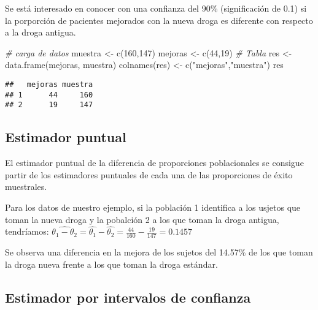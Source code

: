 \documentclass[
]{book}
\newenvironment{Shaded}{\begin{snugshade}}{\end{snugshade}}
\newcommand{\CommentTok}[1]{\textcolor[rgb]{0.56,0.35,0.01}{\textit{#1}}}
\newcommand{\DecValTok}[1]{\textcolor[rgb]{0.00,0.00,0.81}{#1}}
\newcommand{\FunctionTok}[1]{\textcolor[rgb]{0.00,0.00,0.00}{#1}}
\newcommand{\NormalTok}[1]{#1}
\newcommand{\OtherTok}[1]{\textcolor[rgb]{0.56,0.35,0.01}{#1}}
\newcommand{\StringTok}[1]{\textcolor[rgb]{0.31,0.60,0.02}{#1}}
\begin{document}
Se está interesado en conocer con una confianza del 90\% (significación de 0.1) si la porporción de pacientes mejorados con la nueva droga es diferente con respecto a la droga antigua.

\begin{Shaded}
\begin{Highlighting}[]
\CommentTok{\# carga de datos }
\NormalTok{muestra }\OtherTok{\textless{}{-}} \FunctionTok{c}\NormalTok{(}\DecValTok{160}\NormalTok{,}\DecValTok{147}\NormalTok{) }
\NormalTok{mejoras }\OtherTok{\textless{}{-}} \FunctionTok{c}\NormalTok{(}\DecValTok{44}\NormalTok{,}\DecValTok{19}\NormalTok{) }
\CommentTok{\# Tabla }
\NormalTok{res }\OtherTok{\textless{}{-}} \FunctionTok{data.frame}\NormalTok{(mejoras, muestra)}
\FunctionTok{colnames}\NormalTok{(res) }\OtherTok{\textless{}{-}} \FunctionTok{c}\NormalTok{(}\StringTok{"mejoras"}\NormalTok{,}\StringTok{"muestra"}\NormalTok{)}
\NormalTok{res}
\end{Highlighting}
\end{Shaded}

\begin{verbatim}
##   mejoras muestra
## 1      44     160
## 2      19     147
\end{verbatim}

\hypertarget{estimador-puntual}{%
\subsection{Estimador puntual}\label{estimador-puntual}}

El estimador puntual de la diferencia de proporciones poblacionales se consigue partir de los estimadores puntuales de cada una de las proporciones de éxito muestrales.

Para los datos de nuestro ejemplo, si la población 1 identifica a los usjetos que toman la nueva droga y la pobalción 2 a los que toman la droga antigua, tendríamos: \(\widehat{\theta_1 - \theta_2} = \widehat{\theta_1} - \widehat{\theta_2} = \frac{44}{160} - \frac{19}{147} = 0.1457\)

Se observa una diferencia en la mejora de los sujetos del 14.57\% de los que toman la droga nueva frente a los que toman la droga estándar.

\hypertarget{estimador-por-intervalos-de-confianza}{%
\subsection{Estimador por intervalos de confianza}\label{estimador-por-intervalos-de-confianza}}
\end{document}
